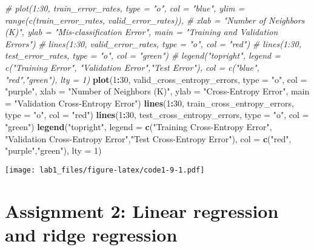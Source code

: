 \documentclass[
]{article}
\newenvironment{Shaded}{\begin{snugshade}}{\end{snugshade}}
\newcommand{\AttributeTok}[1]{\textcolor[rgb]{0.13,0.29,0.53}{#1}}
\newcommand{\CommentTok}[1]{\textcolor[rgb]{0.56,0.35,0.01}{\textit{#1}}}
\newcommand{\DecValTok}[1]{\textcolor[rgb]{0.00,0.00,0.81}{#1}}
\newcommand{\FunctionTok}[1]{\textcolor[rgb]{0.13,0.29,0.53}{\textbf{#1}}}
\newcommand{\NormalTok}[1]{#1}
\newcommand{\SpecialCharTok}[1]{\textcolor[rgb]{0.81,0.36,0.00}{\textbf{#1}}}
\newcommand{\StringTok}[1]{\textcolor[rgb]{0.31,0.60,0.02}{#1}}
\begin{document}
\begin{Shaded}
\begin{Highlighting}[]
\CommentTok{\# plot(1:30, train\_error\_rates, type = "o", col = "blue", ylim = range(c(train\_error\_rates, valid\_error\_rates)),}
\CommentTok{\#    xlab = "Number of Neighbors (K)", ylab = "Mis{-}classification Error", main = "Training and Validation Errors")}
\CommentTok{\# lines(1:30, valid\_error\_rates, type = "o", col = "red")}
\CommentTok{\# lines(1:30, test\_error\_rates, type = "o", col = "green")}
\CommentTok{\# legend("topright", legend = c("Training Error", "Validation Error","Test Error"), col = c("blue", "red","green"), lty = 1)}
\FunctionTok{plot}\NormalTok{(}\DecValTok{1}\SpecialCharTok{:}\DecValTok{30}\NormalTok{, valid\_cross\_entropy\_errors, }\AttributeTok{type =} \StringTok{"o"}\NormalTok{, }\AttributeTok{col =} \StringTok{"purple"}\NormalTok{,}
   \AttributeTok{xlab =} \StringTok{"Number of Neighbors (K)"}\NormalTok{, }\AttributeTok{ylab =} \StringTok{"Cross{-}Entropy Error"}\NormalTok{, }\AttributeTok{main =} \StringTok{"Validation Cross{-}Entropy Error"}\NormalTok{)}
\FunctionTok{lines}\NormalTok{(}\DecValTok{1}\SpecialCharTok{:}\DecValTok{30}\NormalTok{, train\_cross\_entropy\_errors, }\AttributeTok{type =} \StringTok{"o"}\NormalTok{, }\AttributeTok{col =} \StringTok{"red"}\NormalTok{)}
\FunctionTok{lines}\NormalTok{(}\DecValTok{1}\SpecialCharTok{:}\DecValTok{30}\NormalTok{, test\_cross\_entropy\_errors, }\AttributeTok{type =} \StringTok{"o"}\NormalTok{, }\AttributeTok{col =} \StringTok{"green"}\NormalTok{)}
\FunctionTok{legend}\NormalTok{(}\StringTok{"topright"}\NormalTok{, }\AttributeTok{legend =} \FunctionTok{c}\NormalTok{(}\StringTok{"Training Cross{-}Entropy Error"}\NormalTok{, }\StringTok{"Validation Cross{-}Entropy Error"}\NormalTok{,}\StringTok{"Test  Cross{-}Entropy Error"}\NormalTok{), }\AttributeTok{col =} \FunctionTok{c}\NormalTok{(}\StringTok{"red"}\NormalTok{, }\StringTok{"purple"}\NormalTok{,}\StringTok{"green"}\NormalTok{), }\AttributeTok{lty =} \DecValTok{1}\NormalTok{)}
\end{Highlighting}
\end{Shaded}

\texttt{[image: lab1\_files/figure-latex/code1-9-1.pdf]}

\section{Assignment 2: Linear regression and ridge
regression}\label{assignment-2-linear-regression-and-ridge-regression}
\end{document}
